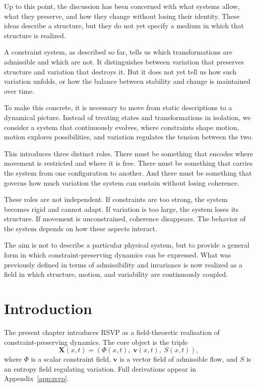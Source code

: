 \documentclass[11pt,openany]{book}
\begin{document}
Up to this point, the discussion has been concerned with what systems allow, what they preserve, and how they change without losing their identity. These ideas describe a structure, but they do not yet specify a medium in which that structure is realized.

A constraint system, as described so far, tells us which transformations are admissible and which are not. It distinguishes between variation that preserves structure and variation that destroys it. But it does not yet tell us how such variation unfolds, or how the balance between stability and change is maintained over time.

To make this concrete, it is necessary to move from static descriptions to a dynamical picture. Instead of treating states and transformations in isolation, we consider a system that continuously evolves, where constraints shape motion, motion explores possibilities, and variation regulates the tension between the two.

This introduces three distinct roles. There must be something that encodes where movement is restricted and where it is free. There must be something that carries the system from one configuration to another. And there must be something that governs how much variation the system can sustain without losing coherence.

These roles are not independent. If constraints are too strong, the system becomes rigid and cannot adapt. If variation is too large, the system loses its structure. If movement is unconstrained, coherence disappears. The behavior of the system depends on how these aspects interact.

The aim is not to describe a particular physical system, but to provide a general form in which constraint-preserving dynamics can be expressed. What was previously defined in terms of admissibility and invariance is now realized as a field in which structure, motion, and variability are continuously coupled.

\section{Introduction}
\label{sec:introduction-rsvp}

The present chapter introduces RSVP as a field-theoretic
realisation of constraint-preserving dynamics. The core
object is the triple
\[
  \mathbf{X}(x,t) = (\Phi(x,t),\; \boldsymbol{v}(x,t),\;
    S(x,t)),
\]
where $\Phi$ is a scalar constraint field, $\boldsymbol{v}$
is a vector field of admissible flow, and $S$ is an entropy
field regulating variation. Full derivations appear in
Appendix~\ref{app:rsvp}.
\end{document}
